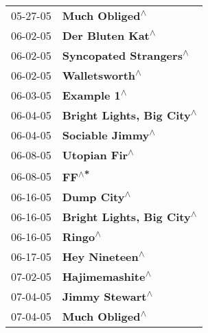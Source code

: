 \begin{supertabular}{p{0.25\columnwidth}p{0.75\columnwidth}}
 05-27-05 &                                                             \textbf{Much Obliged\textsuperscript{$\wedge$}} \\
 06-02-05 &                                                           \textbf{Der Bluten Kat\textsuperscript{$\wedge$}} \\
 06-02-05 &                                                     \textbf{Syncopated Strangers\textsuperscript{$\wedge$}} \\
 06-02-05 &                                                             \textbf{Walletsworth\textsuperscript{$\wedge$}} \\
 06-03-05 &                                                                \textbf{Example 1\textsuperscript{$\wedge$}} \\
 06-04-05 &                                                  \textbf{Bright Lights, Big City\textsuperscript{$\wedge$}} \\
 06-04-05 &                                                           \textbf{Sociable Jimmy\textsuperscript{$\wedge$}} \\
 06-08-05 &                                                              \textbf{Utopian Fir\textsuperscript{$\wedge$}} \\
 06-08-05 &                                                                      \textbf{FF\textsuperscript{$\wedge$*}} \\
 06-16-05 &                                                                \textbf{Dump City\textsuperscript{$\wedge$}} \\
 06-16-05 &                                                  \textbf{Bright Lights, Big City\textsuperscript{$\wedge$}} \\
 06-16-05 &                                                                    \textbf{Ringo\textsuperscript{$\wedge$}} \\
 06-17-05 &                                                             \textbf{Hey Nineteen\textsuperscript{$\wedge$}} \\
 07-02-05 &                                                            \textbf{Hajimemashite\textsuperscript{$\wedge$}} \\
 07-04-05 &                                                            \textbf{Jimmy Stewart\textsuperscript{$\wedge$}} \\
 07-04-05 &                                                             \textbf{Much Obliged\textsuperscript{$\wedge$}} \\

\end{supertabular}

